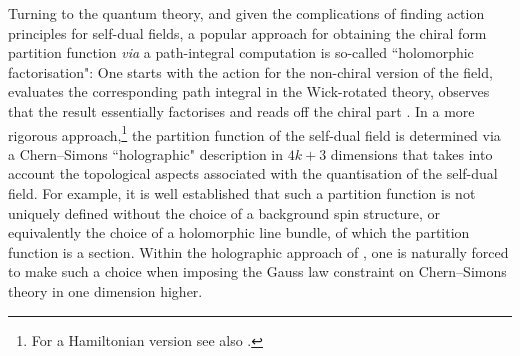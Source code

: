 \documentclass[11pt]{article}
\numberwithin{equation}{section}
\begin{document}
Turning to the quantum theory, and given the complications of finding action principles for self-dual fields, a popular approach for obtaining the chiral form partition function \textit{via} a path-integral computation is so-called ``holomorphic factorisation": One starts with the action for the non-chiral version of the field, evaluates the corresponding path integral in the Wick-rotated theory, observes that the result essentially factorises and reads off the chiral part \cite{Alvarez-Gaume:1986nqf,Alvarez-Gaume:1987wwg,Henningson:1999dm}. In a more rigorous approach,\footnote{For a Hamiltonian version see also \cite{Freed:2006ya,Freed:2006yc}.} the partition function of the self-dual field is determined via a Chern--Simons ``holographic" description in $4k+3$ dimensions \cite{Witten:1988hf,Witten:1996hc,Belov:2006jd} that  takes into account the topological aspects associated with the quantisation of the self-dual field. For example, it is well established that such a partition function is not uniquely defined without the choice of a background spin structure,
or equivalently the choice of a holomorphic line bundle, of which the partition function is a section. Within the holographic approach of \cite{Belov:2006jd}, one is naturally forced to make such a choice when imposing the Gauss law constraint on Chern--Simons theory in one dimension higher.
\end{document}
